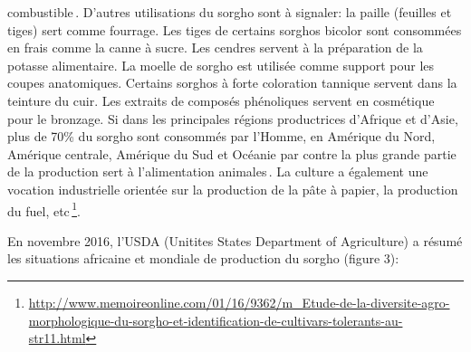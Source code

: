 \documentclass[a4paper,11pt]{article}
\begin{document}
combustible\,\cite{SaintClair_1989}.  D’autres utilisations du sorgho
sont à signaler: la paille (feuilles et tiges) sert comme
fourrage. Les tiges de certains sorghos bicolor sont consommées en
frais comme la canne à sucre. Les cendres servent à la préparation de
la potasse alimentaire. La moelle de sorgho est utilisée comme support
pour les coupes anatomiques. Certains sorghos à forte coloration
tannique servent dans la teinture du cuir. Les extraits de composés
phénoliques servent en cosmétique pour le bronzage. Si dans les
principales régions productrices d’Afrique et d’Asie, plus de 70\% du
sorgho sont consommés par l’Homme, en Amérique du Nord, Amérique
centrale, Amérique du Sud et Océanie par contre la plus grande partie
de la production sert à l’alimentation
animales\,\cite{BARRO_KONDOMBO_2010}. La culture a également une
vocation industrielle orientée sur la production de la pâte à papier,
la production du fuel,
etc\,\footnote{\url{http://www.memoireonline.com/01/16/9362/m_Etude-de-la-diversite-agro-morphologique-du-sorgho-et-identification-de-cultivars-tolerants-au-str11.html}}.

En novembre 2016, l’USDA (Unitites States Department of Agriculture) a résumé les situations africaine et mondiale de production du sorgho (figure 3):


\end{document}
